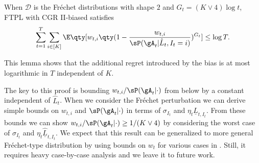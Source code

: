 
\begin{lemma}\label{lem: additive term by CGR biased}
    When $\mathcal{D}$ is the Fr\'{e}chet distributions with shape $2$ and $G_t=(K\lor 4)\log t$, FTPL with CGR II-biased satisfies
    \begin{equation*}
        \sum_{t=1}^T \sum_{i\in [K]}\E\qty[w_{t,i} \qty(1-\frac{w_{t,i}}{\sP(\gA_{t}|\hat{L}_t, I_t=i)})^{G_t}] \leq \log T.
    \end{equation*}
\end{lemma}
This lemma shows that the additional regret introduced by the bias
is at most logarithmic in $T$ independent of $K$.

The key to this proof is bounding $w_{t,i}/\sP(\gA_{t}|\cdot)$ from below by a constant independent of $\hat{L}_t$.
When we consider the Fr\'echet perturbation we can derive simple bounds on $w_{t,i}$ and $\sP(\gA_{t}|\cdot)$ in terms of
$\sigma_{I_t}$ and $\eta_t\underline{\hat{L}}_{t,I_t}$.
From these bounds we can show
$w_{t,i}/\sP(\gA_{t}|\cdot)\ge 1/(K\lor 4)$ by considering the worst case of
$\sigma_{I_t}$ and $\eta_t\underline{\hat{L}}_{t,I_t}$.
We expect that this result can be generalized to more general Fr\'echet-type distribution by
using bounds on $w_t$ for various cases in \citet{pmlr-v247-lee24a}.
Still, it requires heavy case-by-case analysis
and we leave it to future work.



